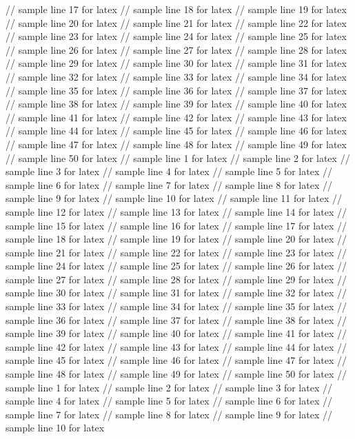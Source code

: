// sample line 17 for latex
// sample line 18 for latex
// sample line 19 for latex
// sample line 20 for latex
// sample line 21 for latex
// sample line 22 for latex
// sample line 23 for latex
// sample line 24 for latex
// sample line 25 for latex
// sample line 26 for latex
// sample line 27 for latex
// sample line 28 for latex
// sample line 29 for latex
// sample line 30 for latex
// sample line 31 for latex
// sample line 32 for latex
// sample line 33 for latex
// sample line 34 for latex
// sample line 35 for latex
// sample line 36 for latex
// sample line 37 for latex
// sample line 38 for latex
// sample line 39 for latex
// sample line 40 for latex
// sample line 41 for latex
// sample line 42 for latex
// sample line 43 for latex
// sample line 44 for latex
// sample line 45 for latex
// sample line 46 for latex
// sample line 47 for latex
// sample line 48 for latex
// sample line 49 for latex
// sample line 50 for latex
// sample line 1 for latex
// sample line 2 for latex
// sample line 3 for latex
// sample line 4 for latex
// sample line 5 for latex
// sample line 6 for latex
// sample line 7 for latex
// sample line 8 for latex
// sample line 9 for latex
// sample line 10 for latex
// sample line 11 for latex
// sample line 12 for latex
// sample line 13 for latex
// sample line 14 for latex
// sample line 15 for latex
// sample line 16 for latex
// sample line 17 for latex
// sample line 18 for latex
// sample line 19 for latex
// sample line 20 for latex
// sample line 21 for latex
// sample line 22 for latex
// sample line 23 for latex
// sample line 24 for latex
// sample line 25 for latex
// sample line 26 for latex
// sample line 27 for latex
// sample line 28 for latex
// sample line 29 for latex
// sample line 30 for latex
// sample line 31 for latex
// sample line 32 for latex
// sample line 33 for latex
// sample line 34 for latex
// sample line 35 for latex
// sample line 36 for latex
// sample line 37 for latex
// sample line 38 for latex
// sample line 39 for latex
// sample line 40 for latex
// sample line 41 for latex
// sample line 42 for latex
// sample line 43 for latex
// sample line 44 for latex
// sample line 45 for latex
// sample line 46 for latex
// sample line 47 for latex
// sample line 48 for latex
// sample line 49 for latex
// sample line 50 for latex
// sample line 1 for latex
// sample line 2 for latex
// sample line 3 for latex
// sample line 4 for latex
// sample line 5 for latex
// sample line 6 for latex
// sample line 7 for latex
// sample line 8 for latex
// sample line 9 for latex
// sample line 10 for latex
